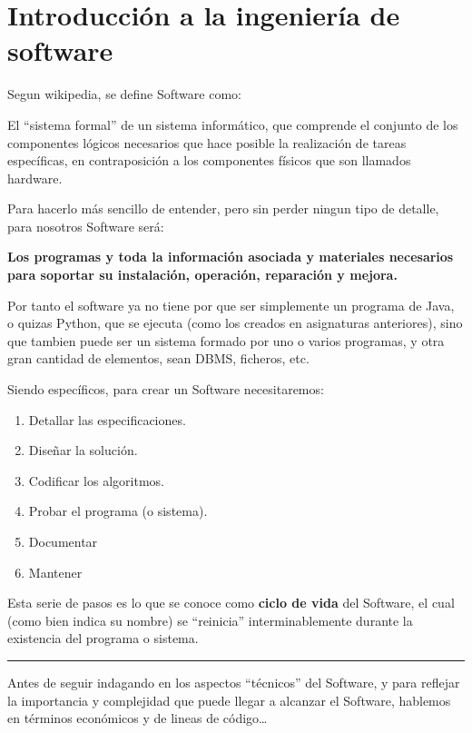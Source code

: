 \section{Introducción a la ingeniería de software}

Segun wikipedia, se define Software como:

\begin{enfasis}
    El ``sistema formal'' de un sistema informático, que comprende el conjunto de los componentes lógicos necesarios
    que hace posible la realización de tareas específicas, en contraposición a los componentes físicos que son 
    llamados hardware.
\end{enfasis}

Para hacerlo más sencillo de entender, pero sin perder ningun tipo de detalle, para nosotros Software será:

\begin{center}
    \textbf{Los programas y toda la información asociada y materiales necesarios para soportar su instalación, 
    operación, reparación y mejora.}
\end{center}

Por tanto el software ya no tiene por que ser simplemente un programa de Java, o quizas Python, que se ejecuta 
(como los creados en asignaturas anteriores), sino que tambien puede ser un sistema formado por uno o varios 
programas, y otra gran cantidad de elementos, sean DBMS, ficheros, etc.

\noindent Siendo específicos, para crear un Software necesitaremos:
\begin{enumerate}
    \item Detallar las especificaciones.
    \item Diseñar la solución.
    \item Codificar los algoritmos.
    \item Probar el programa (o sistema).
    \item Documentar
    \item Mantener
\end{enumerate}
\noindent Esta serie de pasos es lo que se conoce como \textbf{ciclo de vida} del Software, el cual (como bien 
indica su nombre) se ``reinicia'' interminablemente durante la existencia del programa o sistema.

\noindent\rule{\textwidth}{0.4pt}

Antes de seguir indagando en los aspectos ``técnicos'' del Software, y para reflejar la importancia y complejidad 
que puede llegar a alcanzar el Software, hablemos en términos económicos y de lineas de código\dots

